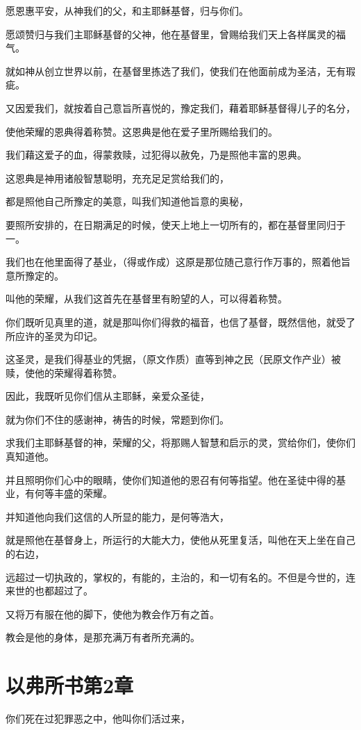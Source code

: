 \documentclass[12pt,oneside]{book}
\begin{document}
愿恩惠平安，从神我们的父，和主耶稣基督，归与你们。

愿颂赞归与我们主耶稣基督的父神，他在基督里，曾赐给我们天上各样属灵的福气。

就如神从创立世界以前，在基督里拣选了我们，使我们在他面前成为圣洁，无有瑕疵。

又因爱我们，就按着自己意旨所喜悦的，豫定我们，藉着耶稣基督得儿子的名分，

使他荣耀的恩典得着称赞。这恩典是他在爱子里所赐给我们的。

我们藉这爱子的血，得蒙救赎，过犯得以赦免，乃是照他丰富的恩典。

这恩典是神用诸般智慧聪明，充充足足赏给我们的，

都是照他自己所豫定的美意，叫我们知道他旨意的奥秘，

要照所安排的，在日期满足的时候，使天上地上一切所有的，都在基督里同归于一。

我们也在他里面得了基业，（得或作成）这原是那位随己意行作万事的，照着他旨意所豫定的。

叫他的荣耀，从我们这首先在基督里有盼望的人，可以得着称赞。

你们既听见真里的道，就是那叫你们得救的福音，也信了基督，既然信他，就受了所应许的圣灵为印记。

这圣灵，是我们得基业的凭据，（原文作质）直等到神之民（民原文作产业）被赎，使他的荣耀得着称赞。

因此，我既听见你们信从主耶稣，亲爱众圣徒，

就为你们不住的感谢神，祷告的时候，常题到你们。

求我们主耶稣基督的神，荣耀的父，将那赐人智慧和启示的灵，赏给你们，使你们真知道他。

并且照明你们心中的眼睛，使你们知道他的恩召有何等指望。他在圣徒中得的基业，有何等丰盛的荣耀。

并知道他向我们这信的人所显的能力，是何等浩大，

就是照他在基督身上，所运行的大能大力，使他从死里复活，叫他在天上坐在自己的右边，

远超过一切执政的，掌权的，有能的，主治的，和一切有名的。不但是今世的，连来世的也都超过了。

又将万有服在他的脚下，使他为教会作万有之首。

教会是他的身体，是那充满万有者所充满的。

\chapter{以弗所书第2章}
你们死在过犯罪恶之中，他叫你们活过来，
\end{document}
